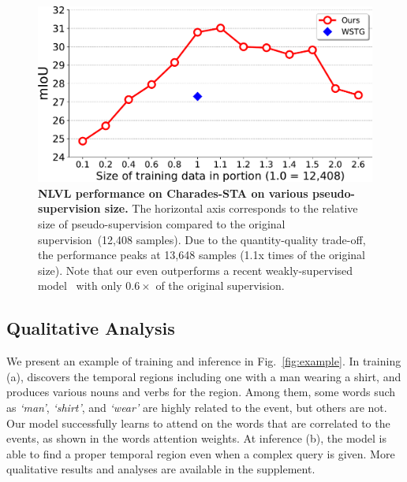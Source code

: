 \begin{figure}[t]
    \centering
    \includegraphics[width=0.90\linewidth]{figures/quantity_p1.pdf}
    \caption{\textbf{NLVL performance on Charades-STA on various pseudo-supervision size.} The horizontal axis corresponds to the relative size of pseudo-supervision compared to the original supervision~(12,408 samples). Due to the quantity-quality trade-off, the performance peaks at 13,648 samples (1.1x times of the original size). Note that our \method even outperforms a recent weakly-supervised model~\cite{lookcloser} with only $0.6\times$ of the original supervision.}
    \vspace{-0.8em}
    \label{fig:quantity}
\end{figure}


\subsection{Qualitative Analysis}
\label{sec:qualitative}

We present an example of training and inference in Fig.~\ref{fig:example}. 
In training (a), \method discovers the temporal regions including one with a man wearing a shirt, and produces various nouns and verbs for the region. 
Among them, some words such as \emph{`man'}, \emph{`shirt'}, and \emph{`wear'} are highly related to the event, but others are not. 
Our model successfully learns to attend on the words that are correlated to the events, as shown in the words attention weights.
At inference (b), the model is able to find a proper temporal region even when a complex query is given.
More qualitative results and analyses are available in the supplement.



